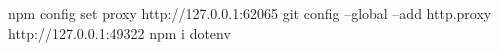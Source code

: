 npm config set proxy http://127.0.0.1:62065
git config --global --add http.proxy http://127.0.0.1:49322
npm i dotenv 